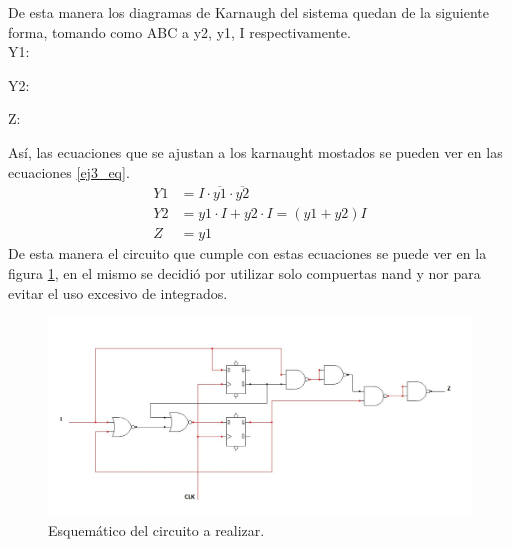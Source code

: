 %
De esta manera los diagramas de Karnaugh del sistema quedan de la siguiente forma, tomando como ABC a y2, y1, I respectivamente.\\
%
Y1:
%
\begin{center}
    \begin{Karnaughvuit}
    \end{Karnaughvuit}
\end{center}
%
Y2:
%
\begin{center}
    \begin{Karnaughvuit}
    \end{Karnaughvuit}
\end{center}
%
Z:
%
\begin{center}
    \begin{Karnaughquatre}
    \end{Karnaughquatre}
\end{center}
%
Así, las ecuaciones que se ajustan a los karnaught mostados se pueden ver en las ecuaciones \ref{ej3_eq}.
%
\begin{equation}
\begin{split}
    Y1&=I \cdot \overline{y1} \cdot \overline{y2}\\
    Y2&=y1 \cdot I+y2 \cdot I = (y1 + y2) I\\
    Z&=y1
\label{ej3_eq}
\end{split}
\end{equation}
%
De esta manera el circuito que cumple con estas ecuaciones se puede ver en la figura \ref{ej3_circuito}, en el mismo se decidió por utilizar solo compuertas nand y nor para evitar el uso excesivo de integrados.
%
\begin{figure}[H]
    \centering
    \includegraphics[width=1\textwidth]{figs/Ej3/circ_ej3.JPG} %
        \caption{Esquemático del circuito a realizar.}
    \label{ej3_circuito}
\end{figure}
